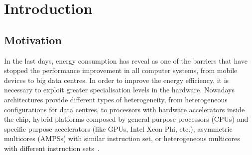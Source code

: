 \cleardoublepage

\chapter*{Introduction}
\label{ch:chapter1}

\section*{Motivation}


In the last days, energy consumption has reveal as one of the barriers that
have stopped the performance improvement in all computer systems, from mobile
devices to big data centres. In order to improve the energy efficiency, it
is necessary to exploit greater specialisation levels in the
hardware. Nowadays architectures provide different types of heterogeneity,
from heterogeneous configurations for data centres, to processors with
hardware accelerators inside the chip, hybrid platforms composed by general
purpose processors (CPUs) and specific purpose accelerators (like GPUs,
Intel Xeon Phi, etc.), asymmetric multicores (AMPSs) with similar
instruction set, or heterogeneous multicores with different instruction
sets~\cite{NRC2011,KoSh13}.



